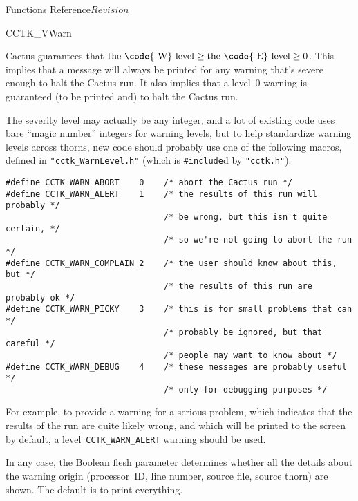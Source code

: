 \begin{cactuspart}{ Functions Reference}{}{$Revision$}
\begin{FunctionDescription}{CCTK\_VWarn}
\begin{Discussion}
Cactus guarantees that
$\hbox{the \code{-W}~level} \ge \hbox{the \code{-E}~level} \ge 0$.
This implies that a message will always be printed for any warning that's
severe enough to halt the Cactus run.  It also implies that a level~0
warning is guaranteed (to be printed and) to halt the Cactus run.

The severity level may actually be any integer, and a lot of existing
code uses bare ``magic number'' integers for warning levels, but to
help standardize warning levels across thorns, new code should probably
use one of the following macros, defined in \verb|"cctk_WarnLevel.h"|
(which is \verb|#include|d by \verb|"cctk.h"|):
\begin{verbatim}
#define CCTK_WARN_ABORT    0    /* abort the Cactus run */
#define CCTK_WARN_ALERT    1    /* the results of this run will probably */
                                /* be wrong, but this isn't quite certain, */
                                /* so we're not going to abort the run */
#define CCTK_WARN_COMPLAIN 2    /* the user should know about this, but */
                                /* the results of this run are probably ok */
#define CCTK_WARN_PICKY    3    /* this is for small problems that can */
                                /* probably be ignored, but that careful */
                                /* people may want to know about */
#define CCTK_WARN_DEBUG    4    /* these messages are probably useful */
                                /* only for debugging purposes */
\end{verbatim}

For example, to provide a warning for a serious problem, which
indicates that the results of the run are quite likely wrong,
and which will be printed to the screen by default,
a level~\verb|CCTK_WARN_ALERT| warning should be used.

In any case, the Boolean flesh parameter 
determines whether all the details about the warning origin (processor~ID,
line number, source file, source thorn) are shown. The default is to
print everything.
\end{Discussion}


\end{FunctionDescription}
\end{cactuspart}
